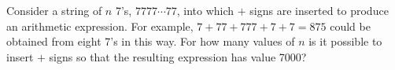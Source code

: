 Consider a string of $n$ 7's, $7777\cdots77$, into which $+$ signs are inserted to produce an arithmetic expression. For example, $7+77+777+7+7=875$ could be obtained from eight 7's in this way. For how many values of $n$ is it possible to insert $+$ signs so that the resulting expression has value 7000?